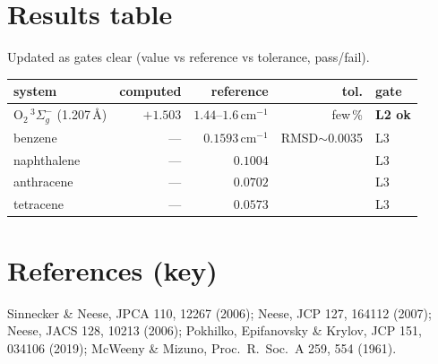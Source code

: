 \documentclass[11pt]{article}
\begin{document}
\section{Results table}\label{sec:results}
Updated as gates clear (value vs reference vs tolerance, pass/fail).
\begin{center}
\begin{tabular}{@{}lrrrl@{}}
\toprule
system & computed & reference & tol. & gate \\
\midrule
O$_2$\,$^3\Sigma_g^-$ (1.207\,\AA) & $+1.503$ & $1.44$--$1.6$\,cm$^{-1}$ & few\,\% & \textbf{L2 ok} \\
benzene & --- & $0.1593$\,cm$^{-1}$ & RMSD$\sim$0.0035 & L3 \\
naphthalene & --- & $0.1004$ & & L3 \\
anthracene & --- & $0.0702$ & & L3 \\
tetracene & --- & $0.0573$ & & L3 \\
\bottomrule
\end{tabular}
\end{center}

\section*{References (key)}
Sinnecker \& Neese, JPCA 110, 12267 (2006);
Neese, JCP 127, 164112 (2007);
Neese, JACS 128, 10213 (2006);
Pokhilko, Epifanovsky \& Krylov, JCP 151, 034106 (2019);
McWeeny \& Mizuno, Proc.\ R.\ Soc.\ A 259, 554 (1961).
\end{document}
